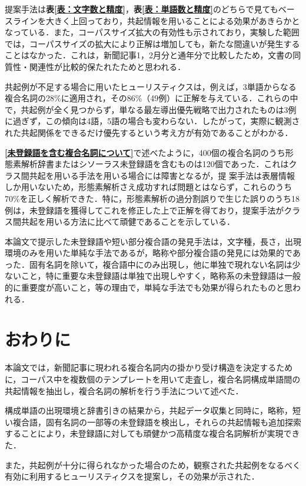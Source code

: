 提案手法は{\bf 表\ref{表：文字数と精度}}，{\bf 表\ref{表：単語数と精度}}のどちらで見てもベースラインを大きく上回っており，共起情報を用いることによる効果があきらかとなっている．また，コーパスサイズ拡大の有効性も示されており，実験した範囲では，コーパスサイズの拡大により正解は増加しても，新たな間違いが発生することはなかった．これは，新聞記事1，2月分と通年分で比較したため，文書の同質性・関連性が比較的保たれたためと思われる．

共起例が不足する場合に用いたヒューリスティクスは，例えば，3単語からなる複合名詞の28\%に適用され，その86\%（49例）に正解を与えている．これらの中で，共起例が全く見つからず，単なる最左導出優先戦略で出力されたものは3例に過ぎず，この傾向は4語，5語の場合も変わらない．したがって，実際に観測された共起関係をできるだけ優先するという考え方が有効であることがわかる．

{\bf \ref{未登録語を含む複合名詞について}}で述べたように，400個の複合名詞のうち形態素解析辞書またはシソーラス未登録語を含むものは120個であった．これはクラス間共起を用いる手法を用いる場合には障害となるが，提\break
案手法は表層情報しか用いないため，形態素解析さえ成功すれば問題とはならず，これらのうち70\%を正しく解析できた．特に，形態素解析の過分割誤りで生じた誤りのうち18例は，未登録語を獲得してこれを修正した上で正解を得ており，提案手法がクラス間共起を用いる方法に比べて頑健であることを示している．

本論文で提示した未登録語や短い部分複合語の発見手法は，文字種，長さ，出現環境のみを用いた単純な手法であるが，略称や部分複合語の発見には効果的であった．固有名詞を除いて，複合語中にのみ出現し，他に単独で現れない名詞は少ないこと，特に重要な未登録語は単独で出現しやすく，略称系の未登録語は一般的に重要度が高いこと，等の理由で，単純な手法でも効果が得られたものと思われる．

\section{おわりに}\label{おわりに}
本論文では，新聞記事に現われる複合名詞内の掛かり受け構造を決定するために，コーパス中を複数個のテンプレートを用いて走査し，複合名詞構成単語間の共起情報を抽出し，複合名詞の解析を行う手法について述べた．

構成単語の出現環境と辞書引きの結果から，共起データ収集と同時に，略称，短い複合語，固有名詞の一部等の未登録語を検出し，それらの共起情報も追加探索することにより，未登録語に対しても頑健かつ高精度な複合名詞解析が実現できた．

また，共起例が十分に得られなかった場合のため，観察された共起例をなるべく有効に利用するヒューリスティクスを提案し，その効果が示された．

